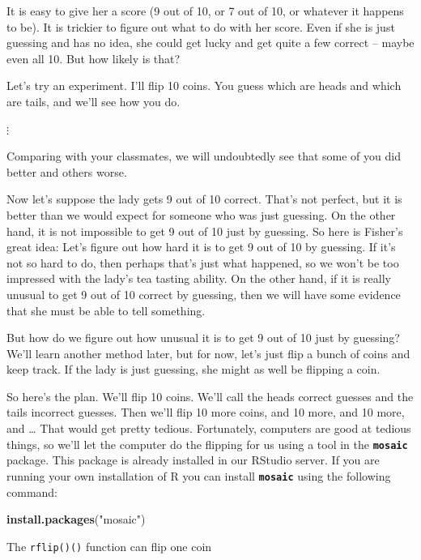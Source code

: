 \documentclass[]{book}
\newenvironment{Shaded}{\begin{snugshade}}{\end{snugshade}}
\newcommand{\KeywordTok}[1]{\textcolor[rgb]{0.13,0.29,0.53}{\textbf{#1}}}
\newcommand{\NormalTok}[1]{#1}
\newcommand{\StringTok}[1]{\textcolor[rgb]{0.31,0.60,0.02}{#1}}
\begin{document}
It is easy to give her a score (9 out of 10, or 7 out of 10, or whatever it happens to be). It is trickier to figure out what to do with her score. Even if she is just guessing and has no idea, she could get lucky and get quite a few correct -- maybe even all 10. But how likely is that?

Let's try an experiment. I'll flip 10 coins. You guess which are heads and which are tails, and we'll see how you do.

\(\vdots\)

Comparing with your classmates, we will undoubtedly see that some of you did better and others worse.

Now let's suppose the lady gets 9 out of 10 correct. That's not perfect, but it is better than we would expect for someone who was just guessing. On the other hand, it is not impossible to get 9 out of 10 just by guessing. So here is Fisher's great idea: Let's figure out how hard it is to get 9 out of 10 by guessing. If it's not so hard to do, then perhaps that's just what happened, so we won't be too impressed with the lady's tea tasting ability. On the other hand, if it is really unusual to get 9 out of 10 correct by guessing, then we will have some evidence that she must be able to tell something.

But how do we figure out how unusual it is to get 9 out of 10 just by guessing? We'll learn another method later, but for now, let's just flip a bunch of coins and keep track. If the lady is just guessing, she might as well be flipping a coin.

So here's the plan. We'll flip 10 coins. We'll call the heads correct guesses and the tails incorrect guesses. Then we'll flip 10 more coins, and 10 more, and 10 more, and \ldots{} That would get pretty tedious. Fortunately, computers are good at tedious things, so we'll let the computer do the flipping for us using a tool in the \textbf{\texttt{mosaic}} package. This package is already installed in our RStudio server. If you are running your own installation of R you can install \textbf{\texttt{mosaic}} using the following command:

\begin{Shaded}
\begin{Highlighting}[]
\KeywordTok{install.packages}\NormalTok{(}\StringTok{"mosaic"}\NormalTok{)}
\end{Highlighting}
\end{Shaded}

The \texttt{rflip()()} function can flip one coin
\end{document}
